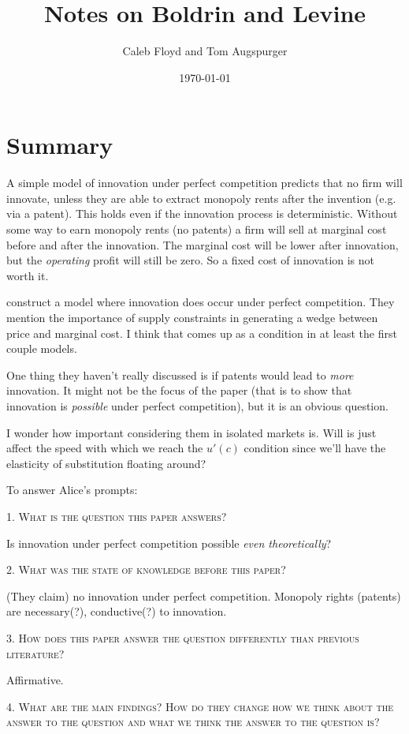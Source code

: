 \documentclass[11pt]{article}
\title{Notes on Boldrin and Levine}
\author{Caleb Floyd and Tom Augspurger}
\date{\today}
\begin{document}
\maketitle

\section{Summary}
\label{sec:summary}
  A simple model of innovation under perfect competition predicts that no firm will innovate, unless they are able to extract monopoly rents after the invention (e.g. via a patent).  This holds even if the innovation process is deterministic.  Without some way to earn monopoly rents (no patents) a firm will sell at marginal cost before and after the innovation.  The marginal cost will be lower after innovation, but the \emph{operating} profit will still be zero.  So a fixed cost of innovation is not worth it. 

  \cite{boldrin_levine:08:pci} construct a model where innovation does occur under perfect competition.  They mention the importance of supply constraints in generating a wedge between price and marginal cost.  I think that comes up as a condition in at least the first couple models.

  One thing they haven't really discussed is if patents would lead to \emph{more} innovation.  It might not be the focus of the paper (that is to show that innovation is \emph{possible} under perfect competition), but it is an obvious question.

  I wonder how important considering them in isolated markets is.  Will is just affect the speed with which we reach the $u'(c)$ condition since we'll have the elasticity of substitution floating around?

  To answer Alice's prompts:

  \textsc{1. What is the question this paper answers?}

  Is innovation under perfect competition possible \emph{even theoretically}?

  \textsc{2. What was the state of knowledge before this paper?}

  (They claim) no innovation under perfect competition.  Monopoly rights (patents) are necessary(?), conductive(?) to innovation.

  \textsc{3. How does this paper answer the question differently than previous literature?}

  Affirmative.

  \textsc{4. What are the main findings? How do they change how we think about the answer to the question and what we think the answer to the question is?}
\end{document}
